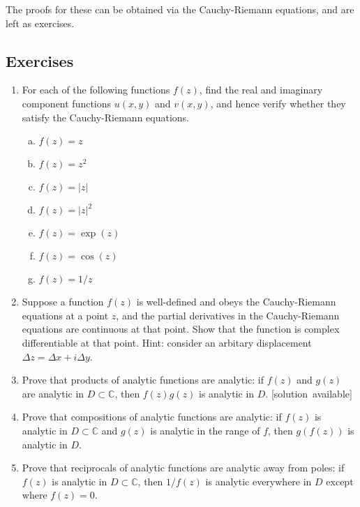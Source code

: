 \documentclass[10pt,a4paper]{article}
\begin{document}
\noindent
The proofs for these can be obtained via the Cauchy-Riemann equations,
and are left as exercises.


\subsection{Exercises}
\label{exercises}

\begin{enumerate}
\item
  For each of the following functions $f(z)$, find the real and
  imaginary component functions $u(x,y)$ and $v(x,y)$, and hence
  verify whether they satisfy the Cauchy-Riemann equations.

  \begin{enumerate}[(a)]
  \item $f(z) = z$
  \item $f(z) = z^2$
  \item $f(z) = |z|$
  \item $f(z) = |z|^2$
  \item $f(z) = \exp(z)$
  \item $f(z) = \cos(z)$
  \item $f(z) = 1/z$
  \end{enumerate}

\item
  Suppose a function $f(z)$ is well-defined and obeys the
  Cauchy-Riemann equations at a point $z$, and the partial derivatives
  in the Cauchy-Riemann equations are continuous at that point. Show
  that the function is complex differentiable at that point. Hint:
  consider an arbitary displacement
  $\Delta z = \Delta x + i \Delta y$.

\item
  Prove that products of analytic functions are analytic: if $f(z)$
  and $g(z)$ are analytic in $D \subset \mathbb{C}$, then
  $f(z) g(z)$ is analytic in $D$.
  \hfill{\scriptsize [solution~available]}

\item
  Prove that compositions of analytic functions are analytic: if
  $f(z)$ is analytic in $D \subset \mathbb{C}$ and $g(z)$ is
  analytic in the range of $f$, then $g(f(z))$ is analytic in $D$.

\item
  Prove that reciprocals of analytic functions are analytic away from
  poles: if $f(z)$ is analytic in $D \subset \mathbb{C}$, then
  $1/f(z)$ is analytic everywhere in $D$ except where $f(z) = 0$.


\end{enumerate}
\end{document}
